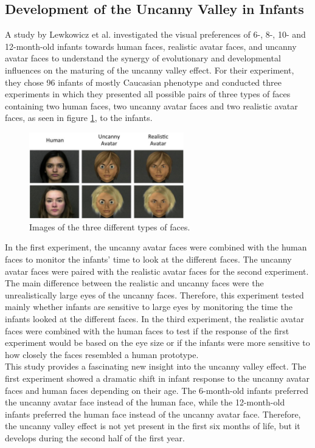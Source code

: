\subsection{Development of the Uncanny Valley in Infants}
A study by Lewkowicz et al. \cite{uncanny_infants} investigated the visual preferences of 6-, 8-, 10- and 12-month-old infants towards human faces, realistic avatar faces, and uncanny avatar faces to understand the synergy of evolutionary and developmental influences on the maturing of the uncanny valley effect. For their experiment, they chose 96 infants of mostly Caucasian phenotype and conducted three experiments in which they presented all possible pairs of three types of faces containing two human faces, two uncanny avatar faces and two realistic avatar faces, as seen in figure \ref{fig:uncannyInfants}, to the infants. 
\begin{figure} %
    \centering
    \includegraphics[width=0.6\textwidth]{graphics/uncanny_infants.png}
    \caption{Images of the three different types of faces.}
    \label{fig:uncannyInfants}
\end{figure}
In the first experiment, the uncanny avatar faces were combined with the human faces to monitor the infants' time to look at the different faces. The uncanny avatar faces were paired with the realistic avatar faces for the second experiment. The main difference between the realistic and uncanny faces were the unrealistically large eyes of the uncanny faces. Therefore, this experiment tested mainly whether infants are sensitive to large eyes by monitoring the time the infants looked at the different faces. In the third experiment, the realistic avatar faces were combined with the human faces to test if the response of the first experiment would be based on the eye size or if the infants were more sensitive to how closely the faces resembled a human prototype.\\
This study provides a fascinating new insight into the uncanny valley effect. The first experiment showed a dramatic shift in infant response to the uncanny avatar faces and human faces depending on their age. The 6-month-old infants preferred the uncanny avatar face instead of the human face, while the 12-month-old infants preferred the human face instead of the uncanny avatar face. Therefore, the uncanny valley effect is not yet present in the first six months of life, but it develops during the second half of the first year.\\
